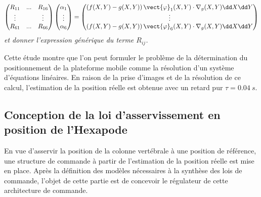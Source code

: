 $$
\begin{pmatrix}
R_{11} & ... & R_{16} \\
\vdots  &     &  \vdots \\
R_{61} & ... & R_{66} \\
\end{pmatrix}
\begin{pmatrix}
\alpha_1 \\
\vdots \\
\alpha_6
\end{pmatrix}
=
\begin{pmatrix}
\left( f(X,Y)-g(X,Y)\right)\vect{\varphi}_1(X,Y)\cdot \nabla_g(X,Y) \dd X \dd Y \\
\vdots \\
\left( f(X,Y)-g(X,Y)\right)\vect{\varphi}_6(X,Y)\cdot \nabla_g(X,Y) \dd X \dd Y \\
\end{pmatrix}
$$
\textit{et donner l’expression générique du terme $R_{ij}$.}
\ifprof
\begin{corrige}
\end{corrige}
\else
\fi


\ifprof
\begin{corrige}
\end{corrige}
\else
\fi

Cette étude montre que l’on peut formuler le problème de la détermination du positionnement de la plateforme
mobile comme la résolution d’un système d’équations linéaires. En raison de la prise d’images et de la résolution
de ce calcul, l’estimation de la position réelle est obtenue avec un retard pur $\tau = \SI{0,04}{s}$.

\subsection{Conception de la loi d'asservissement en position de l'Hexapode}
\begin{obj}
En vue d’asservir la position de la colonne vertébrale à une position de référence, une structure de
commande à partir de l’estimation de la position réelle est mise en place. Après la définition des
modèles nécessaires à la synthèse des lois de commande, l’objet de cette partie est de concevoir le
régulateur de cette architecture de commande.
\end{obj}


